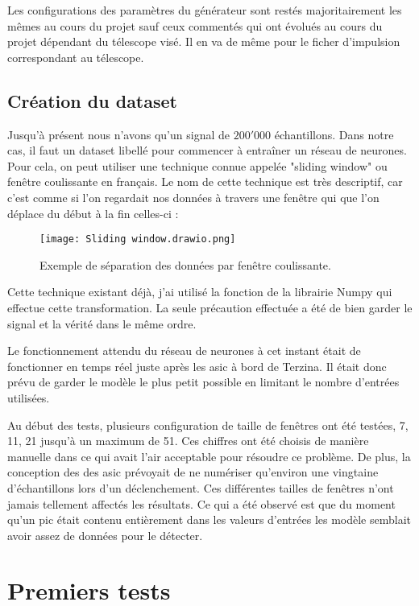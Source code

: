 Les configurations des paramètres du générateur sont restés majoritairement les mêmes au cours du projet 
sauf ceux commentés qui ont évolués au cours du projet dépendant du télescope visé. Il en va de même pour le ficher
d'impulsion correspondant au télescope.

\newpage
\subsection{Création du dataset}
Jusqu'à présent nous n'avons qu'un signal de $200'000$ échantillons. Dans notre cas, il faut un dataset libellé pour commencer 
à entraîner un réseau de neurones. Pour cela, on peut utiliser une technique connue appelée "sliding window" ou fenêtre coulissante en français.
Le nom de cette technique est très descriptif, car c'est comme si l'on regardait nos données à travers une fenêtre qui que l'on déplace du début à la fin celles-ci :

\begin{figure}[tbph!]
	\centering
	\texttt{[image: Sliding window.drawio.png]}
	\caption[Exemple de séparation des données par fenêtre coulissante]{Exemple de séparation des données par fenêtre coulissante.}
\end{figure}

Cette technique existant déjà, j'ai utilisé la fonction de la librairie Numpy qui effectue cette transformation.
La seule précaution effectuée a été de bien garder le signal et la vérité dans le même ordre.

Le fonctionnement attendu du réseau de neurones à cet instant était de fonctionner en temps réel juste après les \gls{asic} à bord de Terzina.
Il était donc prévu de garder le modèle le plus petit possible en limitant le nombre d'entrées utilisées. 

Au début des tests, plusieurs configuration de taille de fenêtres ont été testées, 7, 11, 21 jusqu'à un maximum de 51. 
Ces chiffres ont été choisis de manière manuelle dans ce qui avait l'air acceptable pour résoudre ce problème. 
De plus, la conception des des \gls{asic} prévoyait de ne numériser qu'environ une vingtaine d'échantillons lors d'un déclenchement.
Ces différentes tailles de fenêtres n'ont jamais tellement affectés les résultats. Ce qui a été observé est que du moment 
qu'un pic était contenu entièrement dans les valeurs d'entrées les modèle semblait avoir assez de données pour le détecter.

\section{Premiers tests}

